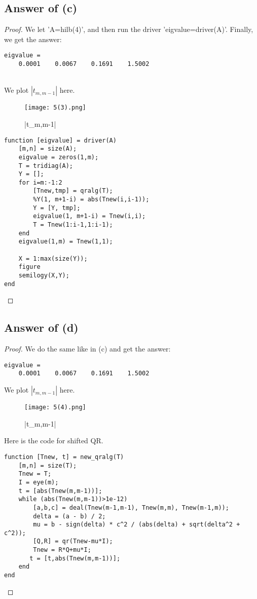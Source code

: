 \documentclass[letterpaper,11pt\iffalse ,draft\fi]{article}
\begin{document}
\subsection*{Answer of (c)}
\begin{proof}

We let 'A=hilb(4)', and then run the driver 'eigvalue=driver(A)'. Finally, we get the answer:

\begin{lstlisting}
eigvalue =
    0.0001    0.0067    0.1691    1.5002
\end{lstlisting}

\\

We plot $|t_{m,m-1}|$ here.
\begin{figure}[htb] \centering 
    \texttt{[image: 5(3).png]}
    \caption{|t_{m,m-1}|}
    \end{figure}


\begin{lstlisting}
function [eigvalue] = driver(A)
    [m,n] = size(A);
    eigvalue = zeros(1,m);
    T = tridiag(A);
    Y = [];
    for i=m:-1:2
        [Tnew,tmp] = qralg(T);
        %Y(1, m+1-i) = abs(Tnew(i,i-1));
        Y = [Y, tmp];
        eigvalue(1, m+1-i) = Tnew(i,i);
        T = Tnew(1:i-1,1:i-1);
    end
    eigvalue(1,m) = Tnew(1,1);
    
    X = 1:max(size(Y));
    figure
    semilogy(X,Y);
end
\end{lstlisting}

\end{proof}


\subsection*{Answer of (d)}
\begin{proof}

We do the same like in (c) and get the answer:
\begin{lstlisting}
eigvalue =
    0.0001    0.0067    0.1691    1.5002
\end{lstlisting}

We plot $|t_{m,m-1}|$ here.
\begin{figure}[htb] \centering 
    \texttt{[image: 5(4).png]}
    \caption{|t_{m,m-1}|}
    \end{figure}
    
Here is the code for shifted QR.

\begin{lstlisting}
function [Tnew, t] = new_qralg(T)
    [m,n] = size(T);
    Tnew = T;
    I = eye(m);
    t = [abs(Tnew(m,m-1))];
    while (abs(Tnew(m,m-1))>1e-12)
        [a,b,c] = deal(Tnew(m-1,m-1), Tnew(m,m), Tnew(m-1,m));
        delta = (a - b) / 2;
        mu = b - sign(delta) * c^2 / (abs(delta) + sqrt(delta^2 + c^2));
        [Q,R] = qr(Tnew-mu*I);
        Tnew = R*Q+mu*I;
       t = [t,abs(Tnew(m,m-1))];
    end
end
\end{lstlisting}

 
\end{proof}
\end{document}
